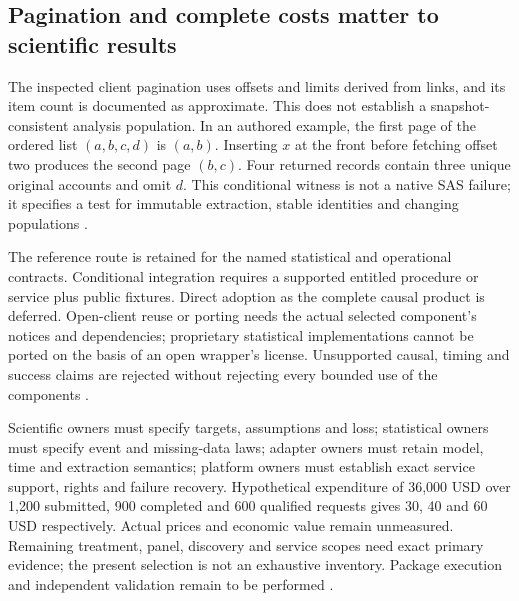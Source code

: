 \subsection{Pagination and complete costs matter to scientific results}
The inspected client pagination uses offsets and limits derived from links,
and its item count is documented as approximate. This does not establish
a snapshot-consistent analysis population. In an authored example, the
first page of the ordered list $(a,b,c,d)$ is $(a,b)$. Inserting $x$ at the
front before fetching offset two produces the second page $(b,c)$. Four
returned records contain three unique original accounts and omit $d$.
This conditional witness is not a native SAS failure; it specifies a
test for immutable extraction, stable identities and changing populations
\cite{exec23_workflow_delegates_sasctl,exec24_sas_choice}.

The reference route is retained for the named statistical and operational
contracts. Conditional integration requires a supported entitled procedure
or service plus public fixtures. Direct adoption as the complete causal
product is deferred. Open-client reuse or porting needs the actual selected
component's notices and dependencies; proprietary statistical implementations
cannot be ported on the basis of an open wrapper's license. Unsupported
causal, timing and success claims are rejected without rejecting every
bounded use of the components \cite{exec24_sas_choice}.

Scientific owners must specify targets, assumptions and loss; statistical
owners must specify event and missing-data laws; adapter owners must retain
model, time and extraction semantics; platform owners must establish exact
service support, rights and failure recovery. Hypothetical expenditure of
36,000 USD over 1,200 submitted, 900 completed and 600 qualified requests
gives 30, 40 and 60 USD respectively. Actual prices and economic value
remain unmeasured. Remaining treatment, panel, discovery and service scopes
need exact primary evidence; the present selection is not an exhaustive
inventory. Package execution and independent validation remain to be performed \cite{exec24_sas_choice}.


